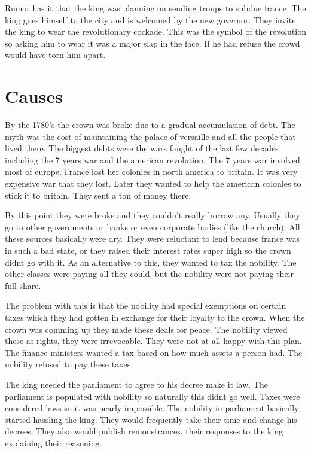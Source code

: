\documentclass{article}
\begin{document}
Rumor has it that the king was planning on sending troups to subdue france. The king goes himself to the city and is welcomed by the new governor. They invite the king to wear the revolutionary cockade. This was the symbol of the revolution so asking him to wear it was a major slap in the face. If he had refuse the crowd would have torn him apart.

\section*{Causes}
\label{sec:causes}
By the 1780's the crown was broke due to a gradual accumulation of debt. The myth was the cost of maintaining the palace of versaille and all the people that lived there. The biggest debts were the wars faught of the last few decades including the 7 years war and the american revolution. The 7 years war involved most of europe. France lost her colonies in north america to britain. It was very expensive war that they lost. Later they wanted to help the american colonies to stick it to britain. They sent a ton of money there.

By this point they were broke and they couldn't really borrow any. Usually they go to other governments or banks or even corporate bodies (like the church). All these sources basically were dry. They were reluctant to lend because france was in such a bad state, or they raised their interest rates super high so the crown didnt go with it. As an alternative to this, they wanted to tax the nobility. The other classes were paying all they could, but the nobility were not paying their full share.

The problem with this is that the nobility had special exemptions on certain taxes which they had gotten in exchange for their loyalty to the crown. When the crown was comming up they made these deals for peace. The nobility viewed these as rights, they were irrevocable. They were not at all happy with this plan. The finance ministers wanted a tax based on how much assets a person had. The nobility refused to pay these taxes.

The king needed the parliament to agree to his decree make it law. The parliament is populated with nobility so naturally this didnt go well. Taxes were considered laws so it was nearly impossible. The nobility in parliament basically started hassling the king. They would frequently take their time and change his decrees. They also would publish remonstrances, their responses to the king explaining their reasoning.
\end{document}

